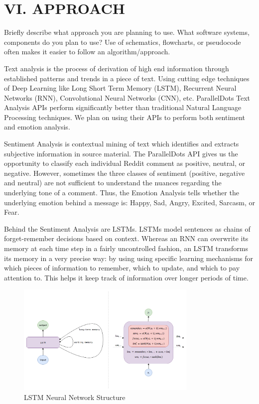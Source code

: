 \documentclass[letterpaper]{article}
\begin{document}
\section{VI. APPROACH}

Briefly describe what approach you are planning to use. What software systems, components do you plan to use? Use of schematics, flowcharts, or pseudocode often makes it easier to follow an algorithm/approach.

Text analysis is the process of derivation of high end information through established patterns and trends in a piece of text. Using cutting edge techniques of Deep Learning like Long Short Term Memory (LSTM), Recurrent Neural Networks (RNN), Convolutional Neural Networks (CNN), etc. ParallelDots Text Analysis APIs perform significantly better than traditional Natural Language Processing techniques. We plan on using their APIs to perform both sentiment and emotion analysis.

Sentiment Analysis is contextual mining of text which identifies and extracts subjective information in source material. The ParallelDots API gives us the opportunity to classify each individual Reddit comment as positive, neutral, or negative. However, sometimes the three classes of sentiment (positive, negative and neutral) are not sufficient to understand the nuances regarding the underlying tone of a comment. Thus, the Emotion Analysis tells whether the underlying emotion behind a message is: Happy, Sad, Angry, Excited, Sarcasm, or Fear.

Behind the Sentiment Analysis are LSTMs. LSTMs model sentences as chains of forget-remember decisions based on context. Whereas an RNN can overwrite its memory at each time step in a fairly uncontrolled fashion, an LSTM transforms its memory in a very precise way: by using using specific learning mechanisms for which pieces of information to remember, which to update, and which to pay attention to. This helps it keep track of information over longer periods of time.

\begin{figure}[!htb]
\begin{center}
\includegraphics[width=3.4in]{lstm.png}
\caption{LSTM Neural Network Structure}
\label{fig1}
\end{center}
\end{figure}
\end{document}

